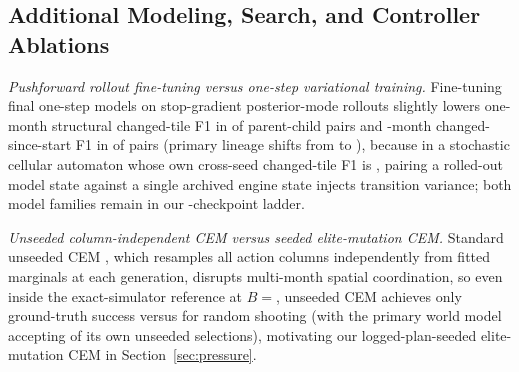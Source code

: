 \begin{table}[tbp]
\caption{Long-horizon rollout drift at the \Horizon-month task horizon and held-out variational log-likelihood (ELBO in nats/transition on the development split at mid-training and full budget) across all final checkpoints and the coverage-retrained model.}
\label{tab:horizon}
\centering\scriptsize\setlength{\tabcolsep}{3.5pt}

\end{table}

\begin{table}[tbp]
\caption{Target-threshold sensitivity on \emph{recover} for random shooting at $B ={}$ on the primary checkpoint, re-evaluated exactly at thresholds set one quarter, one half, and three quarters of the way between the best constant no-build plan ($c$) and the engine-search ceiling ($e$).}
\label{tab:threshold}
\centering\scriptsize\setlength{\tabcolsep}{3.5pt}

\end{table}

\begin{table}[tbp]
\caption{In-imagination PPO performance across all \RlCkptsDone{} world-model checkpoints after \RlMonths{} imagined steps (means over five task families and three seeds per cell, with engine-trained PPO reference optimism gap \RlEngGap{} \ci{\RlEngGapCI}).}
\label{tab:rl}
\centering\scriptsize\setlength{\tabcolsep}{4pt}

\end{table}

\subsection{Additional Modeling, Search, and Controller Ablations}\label{app:ablations}

\emph{Pushforward rollout fine-tuning versus one-step variational training.} Fine-tuning final one-step models on stop-gradient posterior-mode rollouts slightly lowers one-month structural changed-tile F1 in \SfLowerOne{} of \SfPairs{} parent-child pairs and \RollA-month changed-since-start F1 in \SfLowerTwelve{} of \SfPairs{} pairs (primary lineage shifts from \TestMainFTwelve{} to \SfMainFTwelve{}), because in a stochastic cellular automaton whose own cross-seed changed-tile F1 is \TestFloorFOne{}, pairing a rolled-out model state against a single archived engine state injects transition variance; both model families remain in our \Ladder-checkpoint ladder.

\emph{Unseeded column-independent CEM versus seeded elite-mutation CEM.} Standard unseeded CEM \citep{deboer2005cem}, which resamples all \PlanColumns{} action columns independently from fitted marginals at each generation, disrupts multi-month spatial coordination, so even inside the exact-simulator reference at $B ={}$, unseeded CEM achieves only \PerfCemThouOrAcc{} ground-truth success versus \PerfRandThouOrAcc{} for random shooting (with the primary world model accepting \CemThouJudgeAcc{} of its own unseeded selections), motivating our logged-plan-seeded elite-mutation CEM in Section~\ref{sec:pressure}.

